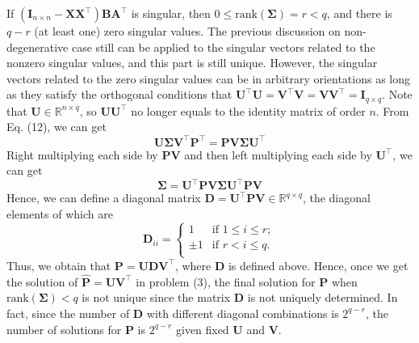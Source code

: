\documentclass[titlepage,11pt,twoside]{article}
\begin{document}
If $(\mathbf{I}_{n\times n}-\mathbf{X}\mathbf{X}^{\top})\mathbf{B}\mathbf{A}^{\top}$ is singular, then $0\le\text{rank}(\mathbf{\Sigma})=r< q$, and there is $q-r$ (at least one) zero singular values. The previous discussion on non-degenerative case still can be applied to the singular vectors related to the nonzero singular values, and this part is still unique. However, the singular vectors related to the zero singular values can be in arbitrary orientations as long as they satisfy the orthogonal conditions that $\mathbf{U}^{\top}\mathbf{U}=\mathbf{V}^{\top}\mathbf{V}=\mathbf{V}\mathbf{V}^{\top}=\mathbf{I}_{q\times q}$. Note that $\mathbf{U}\in \mathbb{R}^{n\times q}$, so $\mathbf{U}\mathbf{U}^{\top}$ no longer equals to the identity matrix of order $n$. From Eq. (12), we can get 
\begin{equation}
\mathbf{U}\mathbf{\Sigma}\mathbf{V}^{\top}\mathbf{P}^{\top}
=
\mathbf{P}\mathbf{V}\mathbf{\Sigma}\mathbf{U}^{\top}
\end{equation}
Right multiplying each side by $\mathbf{P}\mathbf{V}$ and then left multiplying each side by $\mathbf{U}^{\top}$, we can get  
\begin{equation}
\mathbf{\Sigma}
=
\mathbf{U}^{\top}\mathbf{P}\mathbf{V}\mathbf{\Sigma}\mathbf{U}^{\top}\mathbf{P}\mathbf{V}
\end{equation}
Hence, we can define a diagonal matrix $\mathbf{D}=\mathbf{U}^{\top}\mathbf{P}\mathbf{V}\in\mathbb{R}^{q\times q}$, the diagonal elements of which are 
\begin{displaymath}
\mathbf{D}_{ii}= \left\{ \begin{array}{ll}
1 & \textrm{if $1\le i\le r$};\\
\pm 1 & \textrm{if $r< i \le q$}.\\
\end{array} \right.
\end{displaymath}
Thus, we obtain that $\mathbf{P}=\mathbf{U}\mathbf{D}\mathbf{V}^{\top}$, where $\mathbf{D}$ is defined above. Hence, once we get the solution of $\mathbf{\hat{P}}=\mathbf{U}\mathbf{V}^{\top}$ in problem (3), the final solution for $\mathbf{P}$ when $\text{rank}(\mathbf{\Sigma})<q$ is not unique since the matrix $\mathbf{D}$ is not uniquely determined. In fact, since the number of $\mathbf{D}$ with different diagonal combinations is $2^{q-r}$, the number of solutions for $\mathbf{P}$ is $2^{q-r}$ given fixed $\mathbf{U}$ and $\mathbf{V}$.

\end{document}
